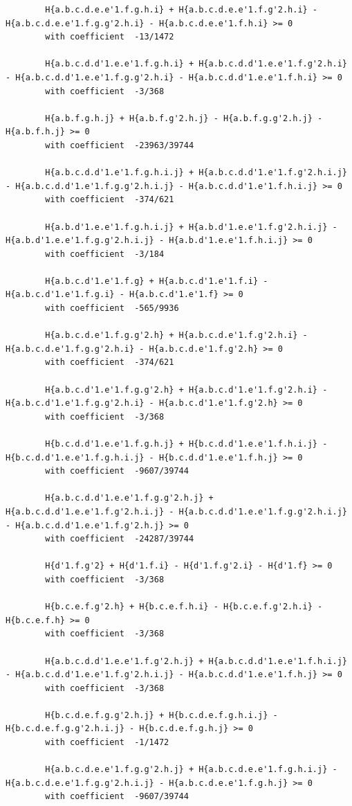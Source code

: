 \documentclass[11pt, a4paper]{kybernetika}
\begin{document}
\begin{verbatim}
		H{a.b.c.d.e.e'1.f.g.h.i} + H{a.b.c.d.e.e'1.f.g'2.h.i} - H{a.b.c.d.e.e'1.f.g.g'2.h.i} - H{a.b.c.d.e.e'1.f.h.i} >= 0
		with coefficient  -13/1472
		
		H{a.b.c.d.d'1.e.e'1.f.g.h.i} + H{a.b.c.d.d'1.e.e'1.f.g'2.h.i} - H{a.b.c.d.d'1.e.e'1.f.g.g'2.h.i} - H{a.b.c.d.d'1.e.e'1.f.h.i} >= 0
		with coefficient  -3/368
		
		H{a.b.f.g.h.j} + H{a.b.f.g'2.h.j} - H{a.b.f.g.g'2.h.j} - H{a.b.f.h.j} >= 0
		with coefficient  -23963/39744
		
		H{a.b.c.d.d'1.e'1.f.g.h.i.j} + H{a.b.c.d.d'1.e'1.f.g'2.h.i.j} - H{a.b.c.d.d'1.e'1.f.g.g'2.h.i.j} - H{a.b.c.d.d'1.e'1.f.h.i.j} >= 0
		with coefficient  -374/621
		
		H{a.b.d'1.e.e'1.f.g.h.i.j} + H{a.b.d'1.e.e'1.f.g'2.h.i.j} - H{a.b.d'1.e.e'1.f.g.g'2.h.i.j} - H{a.b.d'1.e.e'1.f.h.i.j} >= 0
		with coefficient  -3/184
		
		H{a.b.c.d'1.e'1.f.g} + H{a.b.c.d'1.e'1.f.i} - H{a.b.c.d'1.e'1.f.g.i} - H{a.b.c.d'1.e'1.f} >= 0
		with coefficient  -565/9936
		
		H{a.b.c.d.e'1.f.g.g'2.h} + H{a.b.c.d.e'1.f.g'2.h.i} - H{a.b.c.d.e'1.f.g.g'2.h.i} - H{a.b.c.d.e'1.f.g'2.h} >= 0
		with coefficient  -374/621
		
		H{a.b.c.d'1.e'1.f.g.g'2.h} + H{a.b.c.d'1.e'1.f.g'2.h.i} - H{a.b.c.d'1.e'1.f.g.g'2.h.i} - H{a.b.c.d'1.e'1.f.g'2.h} >= 0
		with coefficient  -3/368
		
		H{b.c.d.d'1.e.e'1.f.g.h.j} + H{b.c.d.d'1.e.e'1.f.h.i.j} - H{b.c.d.d'1.e.e'1.f.g.h.i.j} - H{b.c.d.d'1.e.e'1.f.h.j} >= 0
		with coefficient  -9607/39744
		
		H{a.b.c.d.d'1.e.e'1.f.g.g'2.h.j} + H{a.b.c.d.d'1.e.e'1.f.g'2.h.i.j} - H{a.b.c.d.d'1.e.e'1.f.g.g'2.h.i.j} - H{a.b.c.d.d'1.e.e'1.f.g'2.h.j} >= 0
		with coefficient  -24287/39744
		
		H{d'1.f.g'2} + H{d'1.f.i} - H{d'1.f.g'2.i} - H{d'1.f} >= 0
		with coefficient  -3/368
		
		H{b.c.e.f.g'2.h} + H{b.c.e.f.h.i} - H{b.c.e.f.g'2.h.i} - H{b.c.e.f.h} >= 0
		with coefficient  -3/368
		
		H{a.b.c.d.d'1.e.e'1.f.g'2.h.j} + H{a.b.c.d.d'1.e.e'1.f.h.i.j} - H{a.b.c.d.d'1.e.e'1.f.g'2.h.i.j} - H{a.b.c.d.d'1.e.e'1.f.h.j} >= 0
		with coefficient  -3/368
		
		H{b.c.d.e.f.g.g'2.h.j} + H{b.c.d.e.f.g.h.i.j} - H{b.c.d.e.f.g.g'2.h.i.j} - H{b.c.d.e.f.g.h.j} >= 0
		with coefficient  -1/1472
		
		H{a.b.c.d.e.e'1.f.g.g'2.h.j} + H{a.b.c.d.e.e'1.f.g.h.i.j} - H{a.b.c.d.e.e'1.f.g.g'2.h.i.j} - H{a.b.c.d.e.e'1.f.g.h.j} >= 0
		with coefficient  -9607/39744
		

\end{verbatim}
\end{document}
